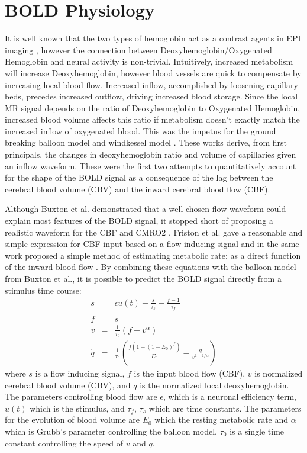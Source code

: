 \section{BOLD Physiology}
\label{sec:BOLD Physiology}
It is well known that the two types of hemoglobin act as a contrast agents in 
EPI imaging \cite{Buxton1998, WEISSKOFF1994, Ogawa}, however the connection
between Deoxyhemoglobin/Oxygenated Hemoglobin and neural activity is non-trivial. 
Intuitively, increased 
metabolism will increase Deoxyhemoglobin, however blood vessels are quick
to compensate by increasing local blood flow. Increased inflow, accomplished by loosening 
capillary beds, precedes increased outflow, driving increased 
blood storage.
Since the local MR signal depends on the ratio of Deoxyhemoglobin to Oxygenated
Hemoglobin, increased blood volume affects this ratio if 
metabolism doesn't exactly match the increased inflow of oxygenated blood.
This was the impetus
for the ground breaking balloon model \cite{Buxton1998} and windkessel
model \cite{Mandeville1999}. These works derive, from first principals,
the changes in deoxyhemoglobin ratio and volume of capillaries given an inflow waveform.
These were the first two attempts to quantitatively account for the shape of the 
BOLD signal as a consequence of the lag between the cerebral blood volume (CBV) 
and the inward cerebral blood flow (CBF). 

Although Buxton et al. demonstrated that a well chosen flow waveform could 
explain most features of the BOLD signal, it stopped short of proposing a
realistic waveform for the CBF and CMRO2 \cite{Buxton1998}. Friston et al. 
gave a reasonable and simple
expression for CBF input based on a flow inducing signal
and in the same work proposed a simple method
of estimating metabolic rate: as a direct function of the inward blood flow \cite{Friston2000}.
By combining these equations with the balloon model from Buxton et al.,
it is possible to predict the BOLD signal directly from a stimulus time course:
\begin{eqnarray}
\dot{s} &=& \epsilon u(t) - \frac{s}{\tau_s} - \frac{f - 1}{\tau_f} \\
\dot{f} &=& s\\
\dot{v} &=& \frac{1}{\tau_0}(f - v^\alpha)\\
\dot{q} &=& \frac{1}{\tau_0}(\frac{f(1-(1-E_0)^f)}{E_0} - \frac{q}{v^{1-1/\alpha}})
\label{eq:bold}
\end{eqnarray}
where $s$ is a flow inducing signal, $f$ is the input blood flow (CBF),
$v$ is normalized cerebral blood volume (CBV), and $q$ is the normalized
local deoxyhemoglobin. The 
parameters controlling blood flow are $\epsilon$, which is a neuronal 
efficiency term, $u(t)$ which is the stimulus, and $\tau_f$, $\tau_s$ 
which are time constants. The parameters for the evolution of blood 
volume are $E_0$ which the resting metabolic
rate and $\alpha$ which is Grubb's parameter controlling the balloon model. 
$\tau_0$ is a single time constant controlling the speed of $v$ and $q$.

